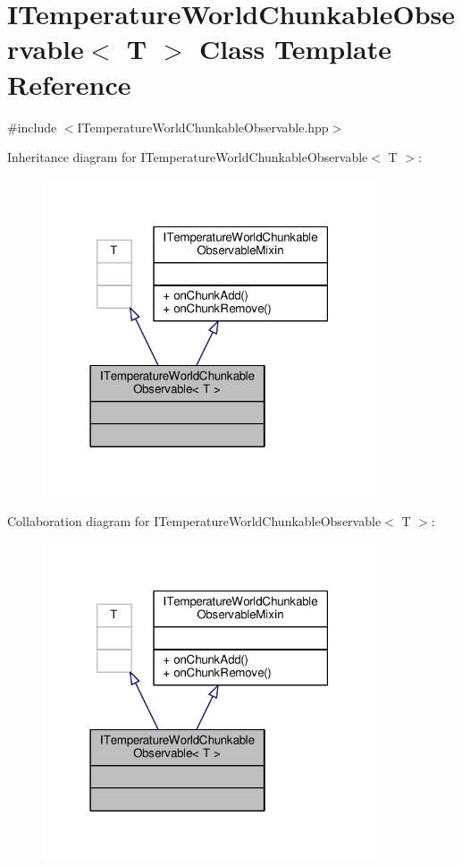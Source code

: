 \hypertarget{class_i_temperature_world_chunkable_observable}{\section{I\-Temperature\-World\-Chunkable\-Observable$<$ T $>$ Class Template Reference}
\label{class_i_temperature_world_chunkable_observable}
}


{\ttfamily \#include $<$I\-Temperature\-World\-Chunkable\-Observable.\-hpp$>$}



Inheritance diagram for I\-Temperature\-World\-Chunkable\-Observable$<$ T $>$\-:
\nopagebreak
\begin{figure}[H]
\begin{center}
\leavevmode
\includegraphics[width=279pt]{class_i_temperature_world_chunkable_observable__inherit__graph}
\end{center}
\end{figure}


Collaboration diagram for I\-Temperature\-World\-Chunkable\-Observable$<$ T $>$\-:
\nopagebreak
\begin{figure}[H]
\begin{center}
\leavevmode
\includegraphics[width=279pt]{class_i_temperature_world_chunkable_observable__coll__graph}
\end{center}
\end{figure}
